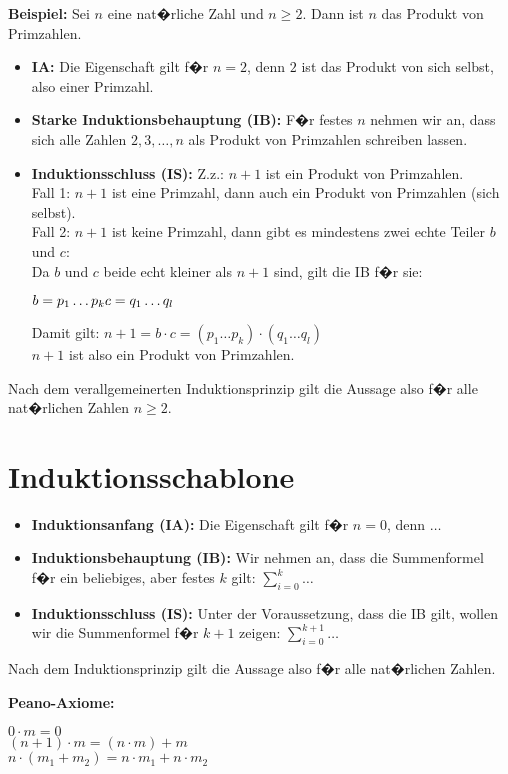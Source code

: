\textbf{Beispiel:} Sei $n$ eine nat�rliche Zahl und $n \geq 2$. Dann ist $n$ das Produkt von Primzahlen. \\
\begin{itemize}
  \item \textbf{IA:} Die Eigenschaft gilt f�r $n = 2$, denn $2$ ist das Produkt von sich selbst, also einer Primzahl.
  \item \textbf{Starke Induktionsbehauptung (IB):} F�r festes $n$ nehmen wir an, dass sich alle Zahlen $2,3,\dots, n$ als Produkt von Primzahlen schreiben lassen.
  \item \textbf{Induktionsschluss (IS):} Z.z.: $n + 1$ ist ein Produkt von Primzahlen.\\
  Fall 1: $n + 1$ ist eine Primzahl, dann auch ein Produkt von Primzahlen (sich selbst).\\
  Fall 2: $n + 1$ ist keine Primzahl, dann gibt es mindestens zwei echte Teiler $b$ und $c$:\\
  Da $b$ und $c$ beide echt kleiner als $n + 1$ sind, gilt die IB f�r sie:
  \begin{center}
    $b = p_1\dots p_k \space\space c = q_1\dots q_l$
    
  \end{center}
  Damit gilt: $n + 1 = b \cdot c = (p_1\dots p_k)\cdot(q_1\dots q_l)$\\
  $n + 1$ ist also ein Produkt von Primzahlen.
\end{itemize}
Nach dem verallgemeinerten Induktionsprinzip gilt die Aussage also f�r alle nat�rlichen Zahlen $n\geq 2$.


\section*{\glqq Induktionsschablone\grqq}
\begin{itemize}
  \item \textbf{Induktionsanfang (IA):} Die Eigenschaft gilt f�r $n = 0$, denn $\dots$
  \item \textbf{Induktionsbehauptung (IB):} Wir nehmen an, dass die Summenformel f�r ein beliebiges, aber festes $k$ gilt: $\sum_{i=0}^{k} \dots$
  \item \textbf{Induktionsschluss (IS):} Unter der Voraussetzung, dass die IB gilt, wollen wir die Summenformel f�r $k + 1$ zeigen: $\sum_{i=0}^{k+1} \dots$
\end{itemize}
Nach dem Induktionsprinzip gilt die Aussage also f�r alle nat�rlichen Zahlen.

\textbf{Peano-Axiome:}
\vspace{-0.3cm}
\begin{center}
  $0 \cdot m = 0$\\
  $(n + 1) \cdot m = (n \cdot m) + m$\\
  $n \cdot (m_1 + m_2) = n \cdot m_1 + n \cdot m_2$
\end{center}
